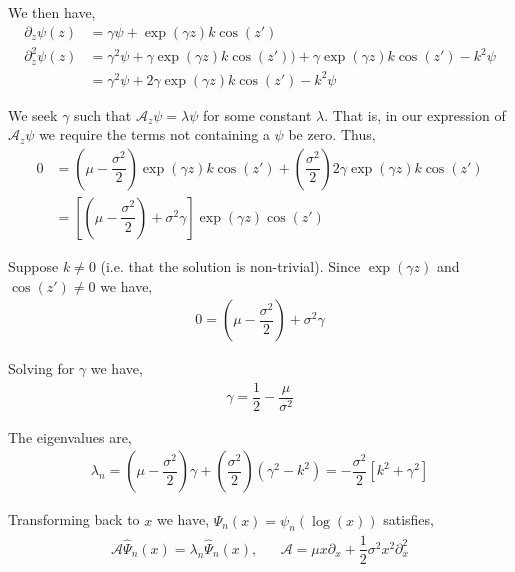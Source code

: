 \documentclass[10pt]{article}
\begin{document}
\begin{solution}[Solution]
We then have,
\begin{align*}
    \partial_z \psi(z) &= \gamma \psi + \exp(\gamma z) k \cos(z') \\
    \partial_z^2 \psi(z) &= \gamma^2 \psi + \gamma \exp(\gamma z) k \cos(z'))
    + \gamma \exp(\gamma z) k \cos(z') - k^2\psi
    \\&= \gamma^2 \psi + 2 \gamma \exp(\gamma z) k \cos(z') - k^2\psi
\end{align*}

We seek \( \gamma \) such that \( \mathcal{A}_z \psi = \lambda \psi \) for some constant \( \lambda \). That is, in our expression of \( \mathcal{A}_z\psi \) we require the terms not containing a \( \psi \) be zero.
Thus,
\begin{align*}
    0 &= \left( \mu - \dfrac{\sigma^2}{2} \right) \exp(\gamma z) k \cos(z') + \left( \dfrac{\sigma^2}{2} \right)2\gamma\exp(\gamma z) k \cos(z') 
    \\&= \left[ \left( \mu - \dfrac{\sigma^2}{2} \right) + \sigma^2 \gamma \right]\exp(\gamma z)\cos(z')
\end{align*}

Suppose \( k\neq 0 \) (i.e. that the solution is non-trivial). Since \( \exp(\gamma z) \) and \( \cos(z')\neq 0 \) we have,
\begin{align*}
    0 = \left( \mu - \dfrac{\sigma^2}{2} \right) + \sigma^2\gamma
\end{align*}

Solving for \( \gamma \) we have,
\begin{align*}
    \gamma = \dfrac{1}{2} - \dfrac{\mu}{\sigma^2}
\end{align*}

The eigenvalues are,
\begin{align*}
    \lambda_n
    = \left( \mu - \dfrac{\sigma^2}{2} \right)\gamma + \left( \dfrac{\sigma^2}{2} \right) \left( \gamma^2 - k^2 \right) = -\dfrac{\sigma^2}{2}[k^2+\gamma^2]
\end{align*}
\iffalse
=-\frac{\pi ^2 n^2 \sigma ^2}{2 (\log (l)-\log (r))^2}-\frac{\left(\sigma ^2-2 \mu \right)^2}{8 \sigma ^2}
    = - \dfrac{\sigma^2}{2}[k^2+\gamma^2]
\fi

Transforming back to \( x \) we have, \( \hat{\Psi}_n(x) = \psi_n(\log(x))  \) satisfies,
\begin{align*}
    \mathcal{A} \hat{\Psi}_n(x) = \lambda_n \hat{\Psi}_n(x), && \mathcal{A}  = \mu x \partial_x + \dfrac{1}{2}\sigma^2 x^2 \partial_x^2
\end{align*}


\end{solution}
\end{document}
